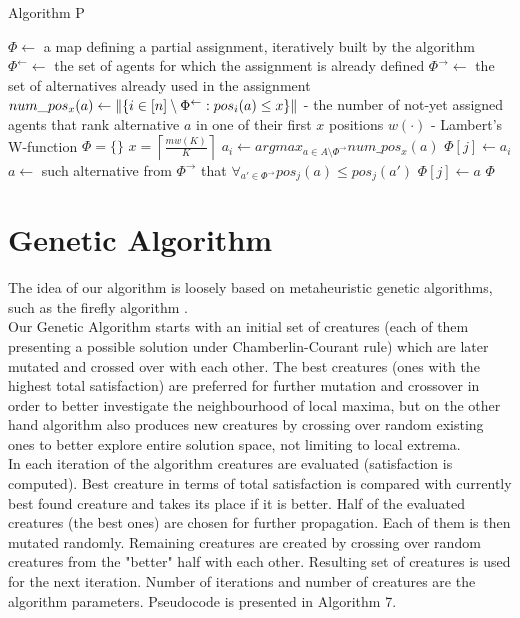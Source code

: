 \begin{algorithm}
\caption{Algorithm P}\label{euclid}
\begin{algorithmic}[1]
		\State $\Phi \gets$ a map defining a partial assignment, iteratively built by the algorithm
		\State $\Phi^{\leftarrow} \gets$ the set of agents for which the assignment is already defined
		\State $\Phi^{\rightarrow} \gets$ the set of alternatives already used in the assignment
		\State $num\_pos_{x}(a) \gets \lVert\left\{ i \in [n] \setminus \Phi^{\leftarrow} : pos_{i}(a) \leq x \right\}\rVert$ - the number of not-yet assigned agents that rank alternative $a$ in one of their first $x$ positions
		\State $w(\cdot)$ - Lambert's W-function
		\State $\Phi = \{\}$
		\State $x = \left\lceil \frac{mw(K)}{K} \right\rceil$
			\State $a_{i} \gets argmax_{a \in A \setminus \Phi^{\rightarrow}} num\_pos_{x}(a)$
					\State $\Phi[j] \gets a_{i}$
				\EndIf
			\EndFor
		\EndFor
			\State $a \gets$ such alternative from $\Phi^{\rightarrow}$ that $\forall_{a' \in \Phi^{\rightarrow}} pos_{j}(a) \leq pos_{j}(a')$
			\State $\Phi[j] \gets a$
		\EndFor
		\State \Return $\Phi$
	\EndProcedure
\end{algorithmic}
\end{algorithm}

\section{Genetic Algorithm}

The idea of our algorithm is loosely based on metaheuristic genetic algorithms, such as the firefly algorithm \cite{6}.
\\

Our Genetic Algorithm starts with an initial set of creatures (each of them presenting a possible solution under Chamberlin-Courant rule) which are later mutated and crossed over with each other. The best creatures (ones with the highest total satisfaction) are preferred for further mutation and crossover in order to better investigate the neighbourhood of local maxima, but on the other hand algorithm also produces new creatures by crossing over random existing ones to better explore entire solution space, not limiting to local extrema.
\\

In each iteration of the algorithm creatures are evaluated (satisfaction is computed). Best creature in terms of total satisfaction is compared with currently best found creature and takes its place if it is better. Half of the evaluated creatures (the best ones) are chosen for further propagation. Each of them is then mutated randomly. Remaining creatures are created by crossing over random creatures from the "better" half with each other. Resulting set of creatures is used for the next iteration. Number of iterations and number of creatures are the algorithm parameters. Pseudocode is presented in Algorithm 7.

